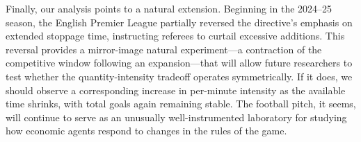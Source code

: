 Finally, our analysis points to a natural extension. Beginning in the
2024--25 season, the English Premier League partially reversed the
directive's emphasis on extended stoppage time, instructing referees to
curtail excessive additions. This reversal provides a mirror-image
natural experiment---a contraction of the competitive window following an
expansion---that will allow future researchers to test whether the
quantity-intensity tradeoff operates symmetrically. If it does, we should
observe a corresponding increase in per-minute intensity as the available
time shrinks, with total goals again remaining stable. The football pitch,
it seems, will continue to serve as an unusually well-instrumented
laboratory for studying how economic agents respond to changes in the
rules of the game.
